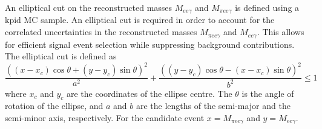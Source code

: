\documentclass[../../main.tex]{subfiles}
\begin{document}
    An elliptical cut on the reconstructed masses $M_{ee \gamma}$ and $M_{\pi ee \gamma}$ is defined using a \gls{kpid} \gls{MC} sample. An elliptical cut is required in order to account for the correlated uncertainties in the reconstructed masses $M_{\pi e e \gamma}$ and $M_{ee \gamma}$. This allows for efficient signal event selection while suppressing background contributions.
    The elliptical cut is defined as
    \begin{equation}\label{eq:elipse}
        \frac{((x - x_c)\cos{\theta} + (y-y_c)\sin{\theta})^2}{a^2} + \frac{((y - y_c)\cos{\theta} - (x-x_c)\sin{\theta})^2}{b^2} \leq 1
    \end{equation}
    where $x_c$ and $y_c$ are the coordinates of the ellipse centre. The $\theta$ is the angle of rotation of the ellipse, and $a$ and $b$ are the lengths of the semi-major and the semi-minor axis, respectively. 
    For the candidate event $x = M_{\pi e e \gamma}$ and $y = M_{ee \gamma}$.
\end{document}
